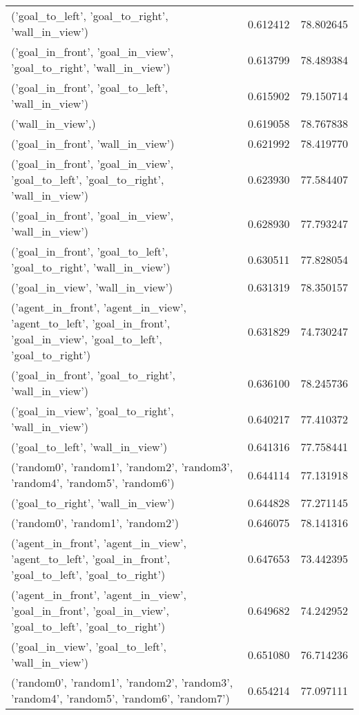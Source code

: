 \begin{tabular}{lrr}
('goal\_to\_left', 'goal\_to\_right', 'wall\_in\_view') & 0.612412 & 78.802645 \\
('goal\_in\_front', 'goal\_in\_view', 'goal\_to\_right', 'wall\_in\_view') & 0.613799 & 78.489384 \\
('goal\_in\_front', 'goal\_to\_left', 'wall\_in\_view') & 0.615902 & 79.150714 \\
('wall\_in\_view',) & 0.619058 & 78.767838 \\
('goal\_in\_front', 'wall\_in\_view') & 0.621992 & 78.419770 \\
('goal\_in\_front', 'goal\_in\_view', 'goal\_to\_left', 'goal\_to\_right', 'wall\_in\_view') & 0.623930 & 77.584407 \\
('goal\_in\_front', 'goal\_in\_view', 'wall\_in\_view') & 0.628930 & 77.793247 \\
('goal\_in\_front', 'goal\_to\_left', 'goal\_to\_right', 'wall\_in\_view') & 0.630511 & 77.828054 \\
('goal\_in\_view', 'wall\_in\_view') & 0.631319 & 78.350157 \\
('agent\_in\_front', 'agent\_in\_view', 'agent\_to\_left', 'goal\_in\_front', 'goal\_in\_view', 'goal\_to\_left', 'goal\_to\_right') & 0.631829 & 74.730247 \\
('goal\_in\_front', 'goal\_to\_right', 'wall\_in\_view') & 0.636100 & 78.245736 \\
('goal\_in\_view', 'goal\_to\_right', 'wall\_in\_view') & 0.640217 & 77.410372 \\
('goal\_to\_left', 'wall\_in\_view') & 0.641316 & 77.758441 \\
('random0', 'random1', 'random2', 'random3', 'random4', 'random5', 'random6') & 0.644114 & 77.131918 \\
('goal\_to\_right', 'wall\_in\_view') & 0.644828 & 77.271145 \\
('random0', 'random1', 'random2') & 0.646075 & 78.141316 \\
('agent\_in\_front', 'agent\_in\_view', 'agent\_to\_left', 'goal\_in\_front', 'goal\_to\_left', 'goal\_to\_right') & 0.647653 & 73.442395 \\
('agent\_in\_front', 'agent\_in\_view', 'goal\_in\_front', 'goal\_in\_view', 'goal\_to\_left', 'goal\_to\_right') & 0.649682 & 74.242952 \\
('goal\_in\_view', 'goal\_to\_left', 'wall\_in\_view') & 0.651080 & 76.714236 \\
('random0', 'random1', 'random2', 'random3', 'random4', 'random5', 'random6', 'random7') & 0.654214 & 77.097111 \\

\end{tabular}
